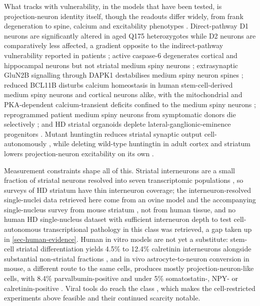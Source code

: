 \documentclass[11pt]{article}
\begin{document}
What tracks with vulnerability, in the models that have been tested, is projection-neuron identity itself, though the readouts differ widely, from frank degeneration \citep{Noel2018,Oh2022} to spine, calcium and excitability phenotypes \citep{Schmidt2020,Fjodorova2023,Goodliffe2018}. Direct-pathway D1 neurons are significantly altered in aged Q175 heterozygotes while D2 neurons are comparatively less affected, a gradient opposite to the indirect-pathway vulnerability reported in patients \citep{Goodliffe2018,Lee2020}; active caspase-6 degenerates cortical and hippocampal neurons but not striatal medium spiny neurons \citep{Noel2018}; extrasynaptic GluN2B signalling through DAPK1 destabilises medium spiny neuron spines \citep{Schmidt2020}; reduced BCL11B disturbs calcium homeostasis in human stem-cell-derived medium spiny neurons and cortical neurons alike, with the mitochondrial and PKA-dependent calcium-transient deficits confined to the medium spiny neurons \citep{Fjodorova2023}; reprogrammed patient medium spiny neurons from symptomatic donors die selectively \citep{Oh2022}; and HD striatal organoids deplete lateral-ganglionic-eminence progenitors \citep{Wu2024}. Mutant huntingtin reduces striatal synaptic output cell-autonomously \citep{Paraskevopoulou2021}, while deleting wild-type huntingtin in adult cortex and striatum lowers projection-neuron excitability on its own \citep{Barron2026}.

Measurement constraints shape all of this. Striatal interneurons are a small fraction of striatal neurons \citep{Andre2018} resolved into seven transcriptomic populations \citep{Wegman2023}, so surveys of HD striatum have thin interneuron coverage; the interneuron-resolved single-nuclei data retrieved here come from an ovine model \citep{Jiang2024} and the accompanying single-nucleus survey from mouse striatum \citep{Malaiya2021}, not from human tissue, and no human HD single-nucleus dataset with sufficient interneuron depth to test cell-autonomous transcriptional pathology in this class was retrieved, a gap taken up in \ref{sec-human-evidence}. Human in vitro models are not yet a substitute: stem-cell striatal differentiation yields 4.5\% to 12.4\% calretinin interneurons alongside substantial non-striatal fractions \citep{LeCann2021}, and in vivo astrocyte-to-neuron conversion in mouse, a different route to the same cells, produces mostly projection-neuron-like cells, with 8.4\% parvalbumin-positive and under 5\% somatostatin-, NPY- or calretinin-positive \citep{Wu2020}. Viral tools do reach the class \citep{AlMassadi2025}, which makes the cell-restricted experiments above feasible and their continued scarcity notable.
\end{document}
